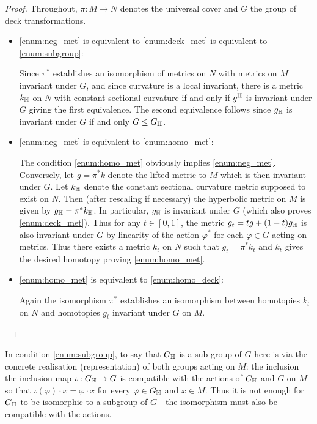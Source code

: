 \documentclass[a4paper, 12pt]{amsart}
\begin{document}
\begin{proof}
Throughout, \(\pi : M \to N\) denotes the universal cover and \(G\) the group of deck transformations.

\begin{itemize}
\item \ref{enum:neg_met} is equivalent to \ref{enum:deck_met} is equivalent to \ref{enum:subgroup}:

Since \(\pi^{\ast}\) establishes an isomorphism of metrics on \(N\) with metrics on \(M\) invariant under \(G\), and since curvature is a local invariant, there is a metric \(k_{\mathbb{H}}\) on \(N\) with constant sectional curvature if and only if \(g^{\mathbb{H}}\) is invariant under \(G\) giving the first equivalence. The second equivalence follows since \(g_{\mathbb{H}}\) is invariant under \(G\) if and only \(G \leq G_{\mathbb{H}}\).

\item \ref{enum:neg_met} is equivalent to \ref{enum:homo_met}:

The condition \ref{enum:homo_met} obviously implies \ref{enum:neg_met}. Conversely, let \(g = \pi^{\ast} k\) denote the lifted metric to \(M\) which is then invariant under \(G\). Let \(k_{\mathbb{H}}\) denote the constant sectional curvature metric supposed to exist on \(N\). Then (after rescaling if necessary) the hyperbolic metric on \(M\) is given by \(g_{\mathbb{H}} = \pi^{\ast} k_{\mathbb{H}}\). In particular, \(g_{\mathbb{H}}\)  is invariant under \(G\) (which also proves \ref{enum:deck_met}). Thus for any \(t \in [0, 1]\), the metric \(g_t = t g + (1-t) g_{\mathbb{H}}\) is also invariant under \(G\) by linearity of the action \(\varphi^{\ast}\) for each \(\varphi \in G\) acting on metrics. Thus there exists a metric \(k_t\) on \(N\) such that \(g_t = \pi^{\ast} k_t\) and \(k_t\) gives the desired homotopy proving \ref{enum:homo_met}.

\item \ref{enum:homo_met} is equivalent to \ref{enum:homo_deck}:

Again the isomorphism \(\pi^{\ast}\) establishes an isomorphism between homotopies \(k_t\) on \(N\) and homotopies \(g_t\) invariant under \(G\) on \(M\).
\end{itemize}
\end{proof}

\begin{rem}
In condition \ref{enum:subgroup}, to say that \(G_{\mathbb{H}}\) is a sub-group of \(G\) here is via the concrete realisation (representation) of both groups acting on \(M\): the inclusion the inclusion map \(\iota : G_{\mathbb{H}} \to G\) is compatible with the actions of \(G_{\mathbb{H}}\) and \(G\) on \(M\) so that \(\iota(\varphi) \cdot x = \varphi \cdot x\) for every \(\varphi \in G_{\mathbb{H}}\) and \(x \in M\). Thus it is not enough for \(G_{\mathbb{H}}\) to be isomorphic to a subgroup of \(G\) - the isomorphism must also be compatible with the actions.
\end{rem}
\end{document}
